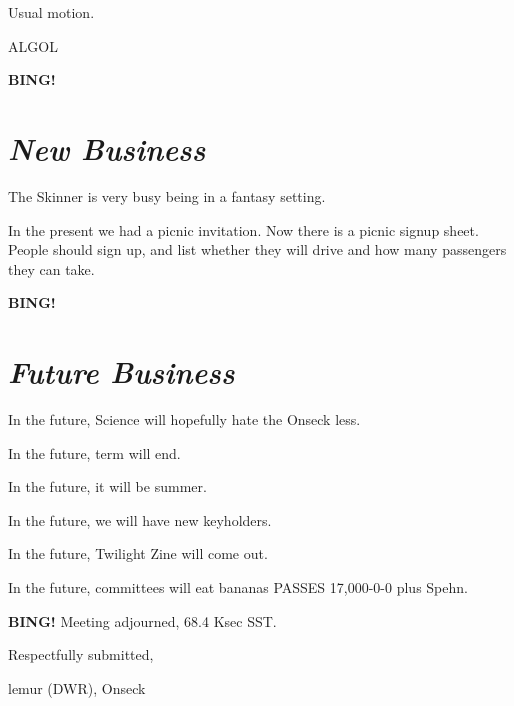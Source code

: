 \documentclass[10pt]{article}
\newcommand{\bing}{{\bf BING!} }
\newcommand{\goto}[1]{\bing \vskip 12pt \section*{{\em{#1}}}}
\newcommand{\ps}{ plus Spehn\xspace}
\newcommand{\onseck}{lemur (DWR), Onseck}
\begin{document}
Usual motion.

ALGOL


\goto{New Business}

The Skinner is very busy being in a fantasy setting.

In the present we had a picnic invitation.  Now there is a picnic
signup sheet.  People should sign up, and list whether they will drive
and how many passengers they can take.


\goto{Future Business}

In the future, Science will hopefully hate the Onseck less.

In the future, term will end.

In the future, it will be summer.

In the future, we will have new keyholders.

In the future, Twilight Zine will come out.

In the future, committees will eat bananas PASSES 17,000-0-0\ps.


\bing
\noindent
Meeting adjourned, 68.4 Ksec SST.

\vspace{18pt}

\centerline{Respectfully submitted,}
\centerline{\onseck}
\end{document}

